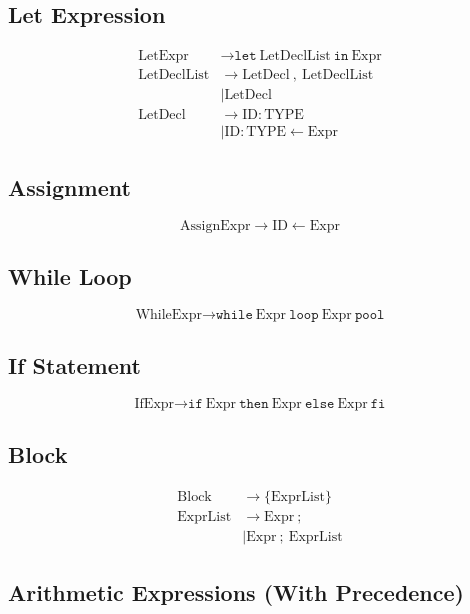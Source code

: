 \documentclass[12pt,a4paper]{article}
\begin{document}
\subsection{Let Expression}

\begin{align*}
\text{LetExpr} &\rightarrow \texttt{let}\ \text{LetDeclList}\ \texttt{in}\ \text{Expr} \\[6pt]
\text{LetDeclList} &\rightarrow \text{LetDecl}\ ,\ \text{LetDeclList} \\
                   &\mid \text{LetDecl} \\[6pt]
\text{LetDecl} &\rightarrow \text{ID} : \text{TYPE} \\
               &\mid \text{ID} : \text{TYPE} \leftarrow \text{Expr}
\end{align*}

\subsection{Assignment}

\[
\text{AssignExpr} \rightarrow \text{ID} \leftarrow \text{Expr}
\]

\subsection{While Loop}

\[
\text{WhileExpr} \rightarrow \texttt{while}\ \text{Expr}\ \texttt{loop}\ \text{Expr}\ \texttt{pool}
\]

\subsection{If Statement}

\[
\text{IfExpr} \rightarrow 
\texttt{if}\ \text{Expr}\ \texttt{then}\ \text{Expr}\ \texttt{else}\ \text{Expr}\ \texttt{fi}
\]

\subsection{Block}

\begin{align*}
\text{Block} &\rightarrow \{ \text{ExprList} \} \\[6pt]
\text{ExprList} &\rightarrow \text{Expr}\ ; \\
                &\mid \text{Expr}\ ;\ \text{ExprList}
\end{align*}

\subsection{Arithmetic Expressions (With Precedence)}
\end{document}
